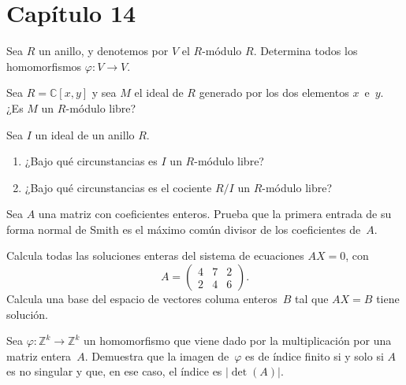\documentclass[12pt]{article}
\begin{document}
    
    \section*{Capítulo 14} %
    \label{sec:capitulo_14}
    
    \begin{exercise}[14.1.1]
        Sea $R$ un anillo, y denotemos por $V$ el $R$-módulo $R$. Determina todos los homomorfismos $\varphi\colon V\to V$.
    \end{exercise}
    
    
    \begin{exercise}[14.2.1]
        Sea $R=\mathbb{C}[x,y]$ y sea $M$ el ideal de $R$ generado por los dos elementos $x$~e~$y$. ¿Es $M$ un $R$-módulo libre?
    \end{exercise}
    
    \begin{exercise}[14.2.4]
        Sea $I$ un ideal de un anillo $R$.
        \begin{enumerate}[\bfseries(a)]
            \item ¿Bajo qué circunstancias es $I$ un $R$-módulo libre?
            \item ¿Bajo qué circunstancias es el cociente $R/I$ un $R$-módulo libre?
        \end{enumerate}
    \end{exercise}
    
    \begin{exercise}[14.4.2]
        Sea $A$ una matriz con coeficientes enteros. Prueba que la primera entrada de su forma normal de Smith es el máximo común divisor de los coeficientes de~$A$.
    \end{exercise}
    
    \begin{exercise}[14.4.3]
        Calcula todas las soluciones enteras del sistema de ecuaciones $AX=0$, con
        \[
            A=\begin{pmatrix}
                4&7&2\\2&4&6
            \end{pmatrix}.
        \]
        Calcula una base del espacio de vectores columa enteros~$B$ tal que $AX=B$ tiene solución.
    \end{exercise}
    
    \begin{exercise}[14.4.6]
        Sea $\varphi\colon \mathbb{Z}^{k}\to \mathbb{Z}^{k}$ un homomorfismo que viene dado por la multiplicación por una matriz entera~$A$. Demuestra que la imagen de~$\varphi$ es de índice finito si y solo si $A$ es no singular y que, en ese caso, el índice es $|\det(A)|$.
    \end{exercise}
    
\end{document}
